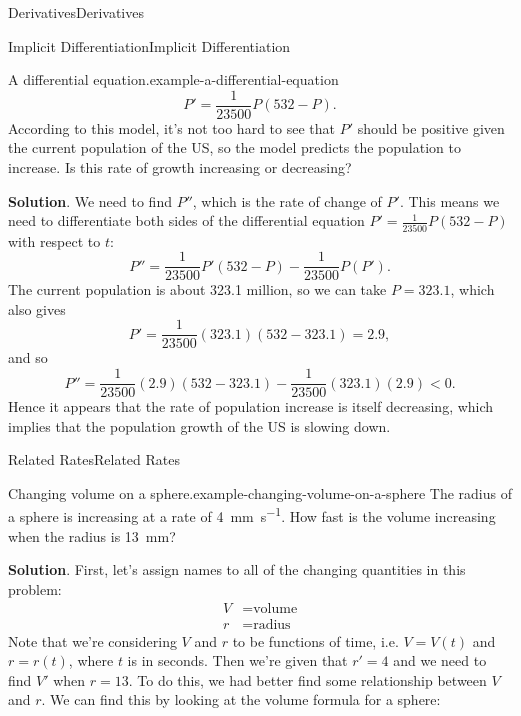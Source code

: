 \documentclass[10pt,]{book}
\numberwithin{equation}{section}
\begin{document}
\begin{chapterptx}{Derivatives}{}{Derivatives}{}{}
\begin{sectionptx}{Implicit Differentiation}{}{Implicit Differentiation}{}{}
\begin{example}{A differential equation.}{example-a-differential-equation}
\begin{equation*}
P' = \frac{1}{23500}P(532-P).
\end{equation*}
According to this model, it's not too hard to see that \(P'\) should be positive given the current population of the US, so the model predicts the population to increase. Is this rate of growth increasing or decreasing?%
\par\smallskip%
\noindent\textbf{Solution}.\hypertarget{solution-36}{}\quad%
\hypertarget{p-168}{}%
We need to find \(P''\), which is the rate of change of \(P'\). This means we need to differentiate both sides of the differential equation \(P' = \frac{1}{23500}P(532-P)\) with respect to \(t\):%
\begin{equation*}
P'' = \frac{1}{23500}P'(532-P) - \frac{1}{23500}P(P').
\end{equation*}
The current population is about 323.1 million, so we can take \(P=323.1\), which also gives%
\begin{equation*}
P' = \frac{1}{23500}(323.1)(532-323.1) = 2.9,
\end{equation*}
and so%
\begin{equation*}
P'' = \frac{1}{23500}(2.9)(532-323.1) - \frac{1}{23500}(323.1)(2.9) < 0.
\end{equation*}
Hence it appears that the rate of population increase is itself decreasing, which implies that the population growth of the US is slowing down.%
\end{example}
\end{sectionptx}
%
%
\typeout{************************************************}
\typeout{************************************************}
%
\begin{sectionptx}{Related Rates}{}{Related Rates}{}{}\label{section-related-rates}
\begin{example}{Changing volume on a sphere.}{example-changing-volume-on-a-sphere}%
\hypertarget{p-169}{}%
The radius of a sphere is increasing at a rate of \SI{4}{\milli\meter\per\second}. How fast is the volume increasing when the radius is \SI{13}{\milli\meter}?%
\par\smallskip%
\noindent\textbf{Solution}.\hypertarget{solution-37}{}\quad%
\hypertarget{p-170}{}%
First, let's assign names to all of the changing quantities in this problem:%
\begin{align*}
V & = \text{volume} \\
r & = \text{radius} 
\end{align*}
Note that we're considering \(V\) and \(r\) to be functions of time, i.e. \(V = V(t)\) and \(r=r(t)\), where \(t\) is in seconds. Then we're given that \(r' = 4\) and we need to find \(V'\) when \(r=13\). To do this, we had better find some relationship between \(V\) and \(r\). We can find this by looking at the volume formula for a sphere:%

\end{example}
\end{sectionptx}
\end{chapterptx}
\end{document}
